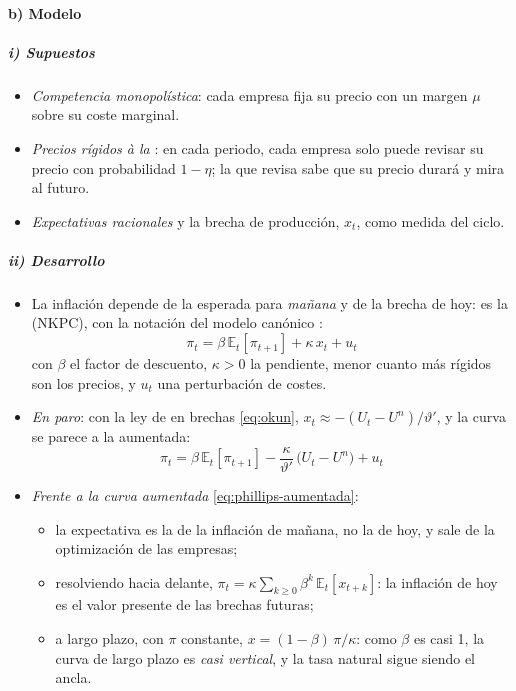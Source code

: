 \documentclass[11pt]{article}
\begin{document}
\paragraph{b) Modelo}

\subparagraph{i) Supuestos}

\begin{itemize}
\item \emph{Competencia monopolística}: cada empresa fija su precio con un margen $\mu$ sobre su coste marginal.
\item \emph{Precios rígidos à la }: en cada periodo, cada empresa solo puede revisar su precio con probabilidad $1-\eta$\nocite{Calvo1983Staggered}; la que revisa sabe que su precio durará y mira al futuro.
\item \emph{Expectativas racionales} y la brecha de producción, $x_t$, como medida del ciclo.
\end{itemize}

\subparagraph{ii) Desarrollo}

\begin{itemize}
\item La inflación depende de la esperada para \emph{mañana} y de la brecha de hoy: es la  (NKPC), con la notación del modelo canónico :
  \begin{equation}
  \pi_t=\beta\,\mathbb{E}_t[\pi_{t+1}]+\kappa\,x_t+u_t \label{eq:nkpc}
  \end{equation}
  con $\beta$ el factor de descuento, $\kappa>0$ la pendiente, menor cuanto más rígidos son los precios, y $u_t$ una perturbación de costes\nocite{ClaridaGaliGertler1999Science}.
\item \emph{En paro}: con la ley de  en brechas \eqref{eq:okun}, $x_t\approx-(U_t-U^n)/\vartheta'$, y la curva se parece a la aumentada:
  \begin{equation*}
  \pi_t=\beta\,\mathbb{E}_t[\pi_{t+1}]-\frac{\kappa}{\vartheta'}\,\big(U_t-U^n\big)+u_t
  \end{equation*}
\item \emph{Frente a la curva aumentada} \eqref{eq:phillips-aumentada}:
  \begin{itemize}
  \item la expectativa es la de la inflación de mañana, no la de hoy, y sale de la optimización de las empresas;
  \item resolviendo hacia delante, $\pi_t=\kappa\sum_{k\geq0}\beta^k\,\mathbb{E}_t[x_{t+k}]$: la inflación de hoy es el valor presente de las brechas futuras;
  \item a largo plazo, con $\pi$ constante, $x=(1-\beta)\,\pi/\kappa$: como $\beta$ es casi 1, la curva de largo plazo es \emph{casi vertical}, y la tasa natural sigue siendo el ancla.
  \end{itemize}
\end{itemize}
\end{document}
